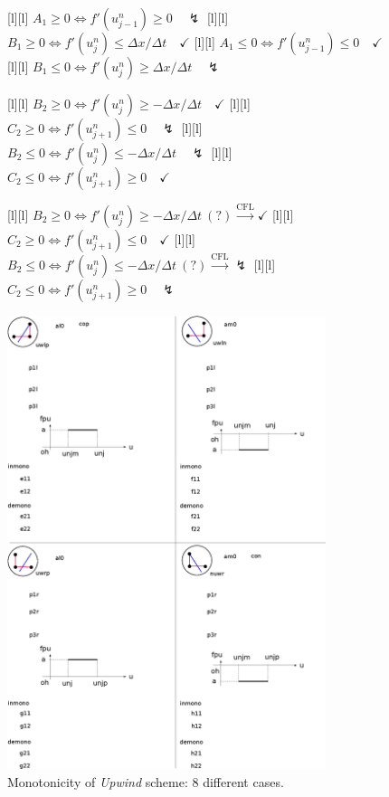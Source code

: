 \begin{figure}[ht]
	[l] {$A_{1}\geq 0 \Leftrightarrow f'(u^{n}_{j-1}) \geq 0\quad \lightning$}
	[l] {$B_{1}\geq 0 \Leftrightarrow f'(u^{n}_{j}) \leq \Delta x/\Delta t \quad \checkmark$}
	[l] {$A_{1}\leq 0 \Leftrightarrow f'(u^{n}_{j-1}) \leq 0\quad \checkmark$}
	[l] {$B_{1}\leq 0 \Leftrightarrow f'(u^{n}_{j}) \geq \Delta x/\Delta t \quad \lightning$}

	[l] {$B_{2}\geq 0 \Leftrightarrow f'(u^{n}_{j})\geq-\Delta x/\Delta t \quad \checkmark$}
	[l] {$C_{2}\geq 0 \Leftrightarrow f'(u^{n}_{j+1}) \leq 0 \quad \lightning$}
	[l] {$B_{2}\leq 0 \Leftrightarrow f'(u^{n}_{j})\leq-\Delta x/\Delta t \quad \lightning$}
	[l] {$C_{2}\leq 0 \Leftrightarrow f'(u^{n}_{j+1}) \geq 0 \quad \checkmark$}

	[l] {$B_{2}\geq 0 \Leftrightarrow f'(u^{n}_{j})\geq-\Delta x/\Delta t \ (?) \stackrel{\text{CFL}}{\rightarrow}\checkmark$}
	[l] {$C_{2}\geq 0 \Leftrightarrow f'(u^{n}_{j+1}) \leq 0 \quad \checkmark$}
	[l] {$B_{2}\leq 0 \Leftrightarrow f'(u^{n}_{j})\leq-\Delta x/\Delta t \ (?) \stackrel{\text{CFL}}{\rightarrow} \lightning$}
	[l] {$C_{2}\leq 0 \Leftrightarrow f'(u^{n}_{j+1}) \geq 0 \quad \lightning$}

	\includegraphics[width=0.83\textwidth]{monotoneUW.eps}
	\caption{Monotonicity of \emph{Upwind} scheme: 8 different cases.}
	\label{\LABEL}
\end{figure}